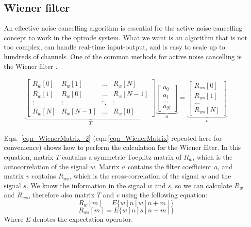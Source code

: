 \subsection{Wiener filter}

An effective noise cancelling algorithm is essential for the active noise cancelling concept to work in the optrode system.  What we want is an algorithm that is not too complex, can handle real-time input-output, and is easy to scale up to hundreds of channels.  One of the common methods for active noise cancelling is the Wiener filter \cite{WienerPaper}. 

\begin{gather} \label{eqn_WienerMatrix_2}
\underbrace{
    \begin{bmatrix}
    R_w[0] & R_w[1] & \dots & R_w[N] \\
    R_w[1] & R_w[0] & \dots & R_w[N-1] \\
    \vdots & \vdots & \ddots & \vdots \\
    R_w[N] & R_w[N-1] & \dots & R_w[0]
    \end{bmatrix}
}_{T}
\underbrace{
    \begin{bmatrix}
    a_0 \\
    a_1 \\
    \dots \\
    a_N
    \end{bmatrix}
}_{a}
=
\underbrace{
    \begin{bmatrix}
    R_{ws}[0] \\
    R_{ws}[1] \\
    \dots \\
    R_{ws}[N]
    \end{bmatrix}
}_{v}
\end{gather}

Eqn.~\ref{eqn_WienerMatrix_2} (eqn.\ref{eqn_WienerMatrix} repeated here for convenience) shows how to perform the calculation for the Wiener filter.  In this equation, matrix $T$ contains a symmetric Toeplitz matrix of $R_w$, which is the autocorrelation of the signal $w$.  Matrix $a$ contains the filter coefficient $a$, and matrix $v$ contains $R_{ws}$, which is the cross-correlation of the signal $w$ and the signal $s$.  We know the information in the signal $w$ and $s$, so we can calculate $R_w$ and $R_{ws}$, therefore also matrix $T$ and $v$ using the following equation:
$$R_w[m]=E\{w[n]w[n+m]\}$$
$$R_{ws}[m]=E\{w[n]s[n+m]\}$$
Where $E$ denotes the expectation operator.

